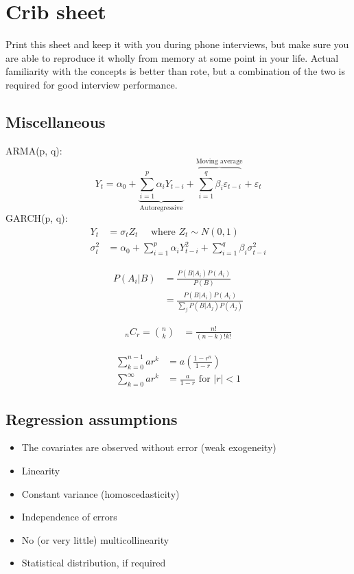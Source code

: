 \documentclass[a4paper]{article}
\begin{document}
\clearpage
\section{Crib sheet}
\label{ap:cribsheet}
Print this sheet and keep it with you during phone interviews, but make sure you are able to reproduce it wholly from memory at some point in your life.
Actual familiarity with the concepts is better than rote, but a combination of the two is required for good interview performance.


\begin{multicols}{2}

\subsection*{Miscellaneous}
ARMA(p, q):
\[
 Y_t = \alpha_0 +
 \underbrace{
  \sum_{i=1}^{p}{ \alpha_i Y_{t-i} }
  }_{\text{Autoregressive}}
  +
 \overbrace{
  \sum_{i=1}^{q}{ \beta_i \varepsilon_{t-i} }
  }^{\text{Moving average}}
  + \varepsilon_{t}
\]
\noindent
GARCH(p, q):
\begin{align*}
 Y_t &= \sigma_t Z_t  \quad \text{ where } Z_t \sim N(0,1) \\
 \sigma^2_{t}
 &=
 \alpha_0 +
  \sum_{i=1}^{p}{ \alpha_i Y^2_{t-i} }
  +
  \sum_{i=1}^{q}{ \beta_i \sigma^2_{t-i} }
\end{align*}


\begin{align*}
P(A_i|B)
&= \frac {P(B|A_i)P(A_i)} {P(B)} \\
&= \frac {P(B|A_i)P(A_i)} { \sum_{j} P(B|A_j)P(A_j) }
\end{align*}

\begin{align*}
{}_nC_{r} =
\binom{n}{k} &= \frac{n!}{ (n-k)! k! }
\end{align*}

\begin{align*}
  \sum_{k=0}^{n-1} {ar^k}    &= a \left(\frac{1-r^n}{1-r}\right) \\
  \sum_{k=0}^{\infty} {ar^k} &= \frac{a}{1-r} \text{ for } |r|<1
\end{align*}

\subsection*{Regression assumptions}

\begin{itemize}[itemsep=-2pt, topsep=2pt, partopsep=0pt]
  \small
  \item The covariates are observed without error (weak exogeneity)
  \item Linearity
  \item Constant variance (homoscedasticity)
  \item Independence of errors
  \item No (or very little) multicollinearity
  \item Statistical distribution, if required
\end{itemize}


\end{multicols}
\end{document}
